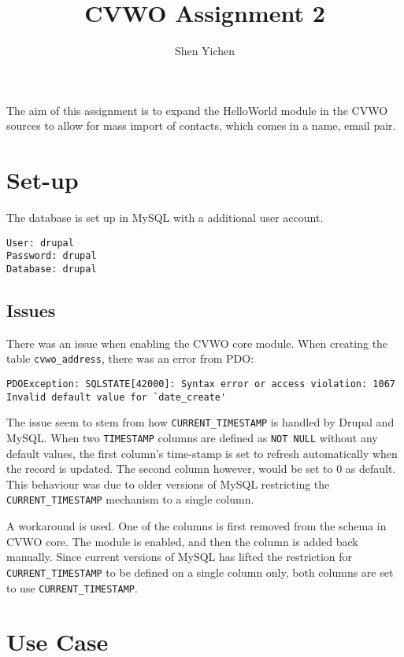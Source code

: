\documentclass[12pt]{article}
\title{\textbf{\textsf{CVWO Assignment 2}}}
\date{}
\author{\textsf{Shen Yichen}}
\begin{document}
\maketitle

The aim of this assignment is to expand the HelloWorld module in the CVWO sources to allow for mass import of contacts, which comes in a {name, email} pair.

\section*{Set-up}

The database is set up in MySQL with a additional user account.

\begin{lstlisting}
User: drupal
Password: drupal
Database: drupal
\end{lstlisting}

\subsection*{Issues}

There was an issue when enabling the CVWO core module. When creating the table \texttt{cvwo\_address}, there was an error from PDO:\@

\begin{lstlisting}
PDOException: SQLSTATE[42000]: Syntax error or access violation: 1067 Invalid default value for `date_create'
\end{lstlisting}

The issue seem to stem from how \texttt{CURRENT\_TIMESTAMP} is handled by Drupal and MySQL\@. When two \texttt{TIMESTAMP} columns are defined as \texttt{NOT NULL} without any default values, the first column's time-stamp is set to refresh automatically when the record is updated. The second column however, would be set to 0 as default. This behaviour was due to older versions of MySQL restricting the \texttt{CURRENT\_TIMESTAMP} mechanism to a single column.

A workaround is used. One of the columns is first removed from the schema in CVWO core. The module is enabled, and then the column is added back manually. Since current versions of MySQL has lifted the restriction for \texttt{CURRENT\_TIMESTAMP} to be defined on a single column only, both columns are set to use \texttt{CURRENT\_TIMESTAMP}.

\section*{Use Case}
\end{document}
